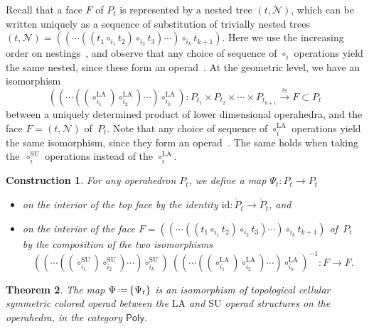 \documentclass{amsart}
\newtheorem{theorem}{Theorem}[section]
\newtheorem{construction}[theorem]{Construction}
\theoremstyle{definition}
\newcommand{\eqdef}{\mbox{\,\raisebox{0.2ex}{\scriptsize\ensuremath{\mathrm:}}\ensuremath{=}\,}} %
\newcommand{\SU}{\mathrm{SU}}
\newcommand{\LA}{\mathrm{LA}}
\newcommand{\PolySub}{\mathsf{Poly}}
\newcommand{\id}{\mathrm{id}}
\begin{document}
Recall that a face $F$ of $P_t$ is represented by a nested tree $(t,\mathcal{N})$, which can be written uniquely as a sequence of substitution of trivially nested trees 
$(t,\mathcal{N})=((\cdots((t_1\circ_{i_1} t_2) \circ_{i_2} t_3) \cdots )\circ_{i_k} t_{k+1})$.
Here we use the increasing order on nestings~\cite[Def. 4.5]{LaplanteAnfossi}, and observe that any choice of sequence of $\circ_i$ operations yield the same nested, since these form an operad~\cite[Def.~4.7]{LaplanteAnfossi}.
At the geometric level, we have an isomorphism
\[((\cdots((\circ_{i_1}^\LA) \circ_{i_2}^\LA) \cdots) \circ_{i_k}^\LA): P_{t_1} \times P_{t_2} \times \cdots \times P_{t_{k+1}} \overset{\cong}{\longrightarrow} F \subset P_t \]
between a uniquely determined product of lower dimensional operahedra, and the face $F=(t,\mathcal{N})$ of~$P_t$.
Note that any choice of sequence of $\circ_i^\LA$ operations yield the same isomorphism, since they form an operad~\cite[Thm.~4.18]{LaplanteAnfossi}.
The same holds when taking the~$\circ_i^\SU$ operations instead of the $\circ_i^\LA$. 

\begin{construction}
	\label{const:top-iso}
	For any operahedron $P_t$, we define a map $\Psi_t : P_t \to P_t$ 
	\begin{itemize}
		\item on the interior of the top face by the identity $\id : \mathring P_t \to \mathring P_t$, and 
		\item on the interior of the face $F=((\cdots((t_1 \circ_{i_1} t_2) \circ_{i_2} t_3) \cdots )\circ_{i_k} t_{k+1})$ of~$P_t$ by the composition of the two isomorphisms
		\[ 
		((\cdots ((\circ_{i_1}^\SU) \circ_{i_2}^\SU) \cdots) \circ_{i_k}^\SU) \ ((\cdots((\circ_{i_1}^\LA) \circ_{i_2}^\LA) \cdots) \circ_{i_k}^\LA)^{-1}: F \to F . \] 
	\end{itemize}
\end{construction}

\begin{theorem}
\label{thm:top-iso}
The map $\Psi \eqdef \{\Psi_t\}$ is an isomorphism of topological cellular symmetric colored operad between the $\LA$ and $\SU$ operad structures on the operahedra, in the category $\PolySub$.
\end{theorem}
\end{document}
